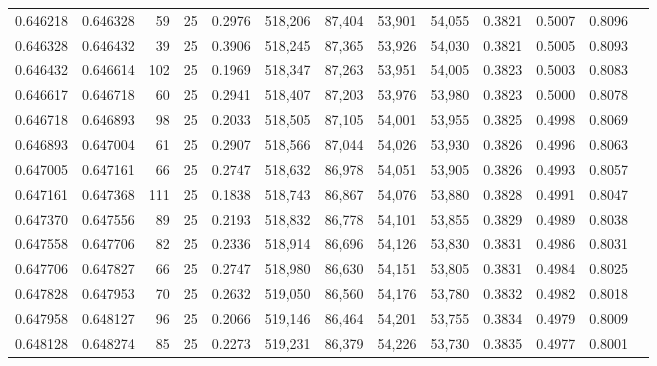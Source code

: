 \begin{tabular}{rrrrrrrrrrrrr}
0.646218 & 0.646328 &    59 &  25 &                                     0.2976 & 518,206 &  87,404 &  53,901 &  54,055 & 0.3821 & 0.5007 & 0.8096 \\
0.646328 & 0.646432 &    39 &  25 &                                     0.3906 & 518,245 &  87,365 &  53,926 &  54,030 & 0.3821 & 0.5005 & 0.8093 \\
0.646432 & 0.646614 &   102 &  25 &                                     0.1969 & 518,347 &  87,263 &  53,951 &  54,005 & 0.3823 & 0.5003 & 0.8083 \\
0.646617 & 0.646718 &    60 &  25 &                                     0.2941 & 518,407 &  87,203 &  53,976 &  53,980 & 0.3823 & 0.5000 & 0.8078 \\
0.646718 & 0.646893 &    98 &  25 &                                     0.2033 & 518,505 &  87,105 &  54,001 &  53,955 & 0.3825 & 0.4998 & 0.8069 \\
0.646893 & 0.647004 &    61 &  25 &                                     0.2907 & 518,566 &  87,044 &  54,026 &  53,930 & 0.3826 & 0.4996 & 0.8063 \\
0.647005 & 0.647161 &    66 &  25 &                                     0.2747 & 518,632 &  86,978 &  54,051 &  53,905 & 0.3826 & 0.4993 & 0.8057 \\
0.647161 & 0.647368 &   111 &  25 &                                     0.1838 & 518,743 &  86,867 &  54,076 &  53,880 & 0.3828 & 0.4991 & 0.8047 \\
0.647370 & 0.647556 &    89 &  25 &                                     0.2193 & 518,832 &  86,778 &  54,101 &  53,855 & 0.3829 & 0.4989 & 0.8038 \\
0.647558 & 0.647706 &    82 &  25 &                                     0.2336 & 518,914 &  86,696 &  54,126 &  53,830 & 0.3831 & 0.4986 & 0.8031 \\
0.647706 & 0.647827 &    66 &  25 &                                     0.2747 & 518,980 &  86,630 &  54,151 &  53,805 & 0.3831 & 0.4984 & 0.8025 \\
0.647828 & 0.647953 &    70 &  25 &                                     0.2632 & 519,050 &  86,560 &  54,176 &  53,780 & 0.3832 & 0.4982 & 0.8018 \\
0.647958 & 0.648127 &    96 &  25 &                                     0.2066 & 519,146 &  86,464 &  54,201 &  53,755 & 0.3834 & 0.4979 & 0.8009 \\
0.648128 & 0.648274 &    85 &  25 &                                     0.2273 & 519,231 &  86,379 &  54,226 &  53,730 & 0.3835 & 0.4977 & 0.8001 \\

\end{tabular}
